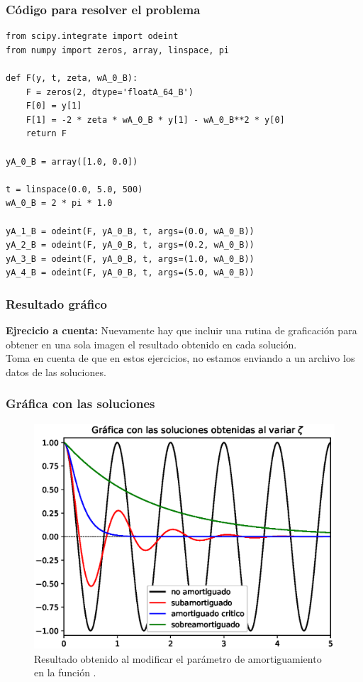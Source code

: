 \begin{frame}
\frametitle{Código para resolver el problema}
\begin{lstlisting}[caption=Código completo para el problema del oscilador, style=codigopython]
from scipy.integrate import odeint
from numpy import zeros, array, linspace, pi

def F(y, t, zeta, wA_0_B):
    F = zeros(2, dtype='floatA_64_B')
    F[0] = y[1]
    F[1] = -2 * zeta * wA_0_B * y[1] - wA_0_B**2 * y[0]
    return F    

yA_0_B = array([1.0, 0.0])

t = linspace(0.0, 5.0, 500)
wA_0_B = 2 * pi * 1.0

yA_1_B = odeint(F, yA_0_B, t, args=(0.0, wA_0_B))
yA_2_B = odeint(F, yA_0_B, t, args=(0.2, wA_0_B))
yA_3_B = odeint(F, yA_0_B, t, args=(1.0, wA_0_B))
yA_4_B = odeint(F, yA_0_B, t, args=(5.0, wA_0_B))
\end{lstlisting}
\end{frame}
\begin{frame}
\frametitle{Resultado gráfico}
\textbf{Ejrecicio a cuenta:} Nuevamente hay que incluir una rutina de graficación para obtener en una sola imagen el resultado obtenido en cada solución.
\\
\bigskip
Toma en cuenta de que en estos ejercicios, no estamos enviando a un archivo los datos de las soluciones.
\end{frame}
\begin{frame}[plain]
\frametitle{Gráfica con las soluciones}
\begin{figure}
    \centering
    \includegraphics[scale=0.5]{Imagenes/ejercicio_odeint_02_oscilador_amortiguado.eps}
    \caption{Resultado obtenido al modificar el parámetro de amortiguamiento en la función .}
\end{figure}
\end{frame}
